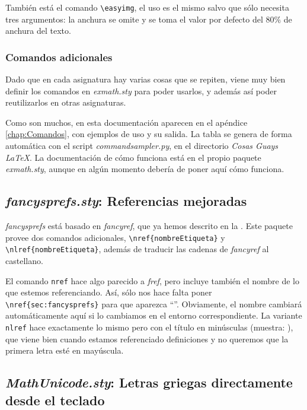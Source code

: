 También está el comando \verb|\easyimg|, el uso es el mismo salvo que sólo necesita tres argumentos: la anchura se omite y se toma el valor por defecto del $80\%$ de anchura del texto.

\subsubsection{Comandos adicionales}
\label{sec:ComandosAdicionales}

Dado que en cada asignatura hay varias cosas que se repiten, viene muy bien definir los comandos en \textit{exmath.sty} para poder usarlos, y además así poder reutilizarlos en otras asignaturas.

Como son muchos, en esta documentación aparecen en el apéndice \ref{chap:Comandos}, con ejemplos de uso y su salida. La tabla se genera de forma automática con el script \textit{commandsampler.py}, en el directorio \textit{Cosas Guays LaTeX}. La documentación de cómo funciona está en el propio paquete \textit{exmath.sty}, aunque en algún momento debería de poner aquí cómo funciona.

\subsection{\textit{fancysprefs.sty}: Referencias mejoradas}
\label{sec:fancysprefs}

\textit{fancysprefs} está basado en \textit{fancyref}, que ya hemos descrito en la . Este paquete provee dos comandos adicionales, \verb|\nref{nombreEtiqueta}| y \verb|\nlref{nombreEtiqueta}|, además de traducir las cadenas de \textit{fancyref} al castellano.

El comando \texttt{nref} hace algo parecido a \textit{fref}, pero incluye también el nombre de lo que estemos referenciando. Así, sólo nos hace falta poner \verb|\nref{sec:fancysprefs}| para que aparezca ``''. Obviamente, el nombre cambiará automáticamente aquí si lo cambiamos en el entorno correspondiente. La variante \texttt{nlref} hace exactamente lo mismo pero con el título en minúsculas (muestra: ), que viene bien cuando estamos referenciado definiciones y no queremos que la primera letra esté en mayúscula.

\subsection{\textit{MathUnicode.sty}: Letras griegas directamente desde el teclado}
\label{sec:MathUnicode}

